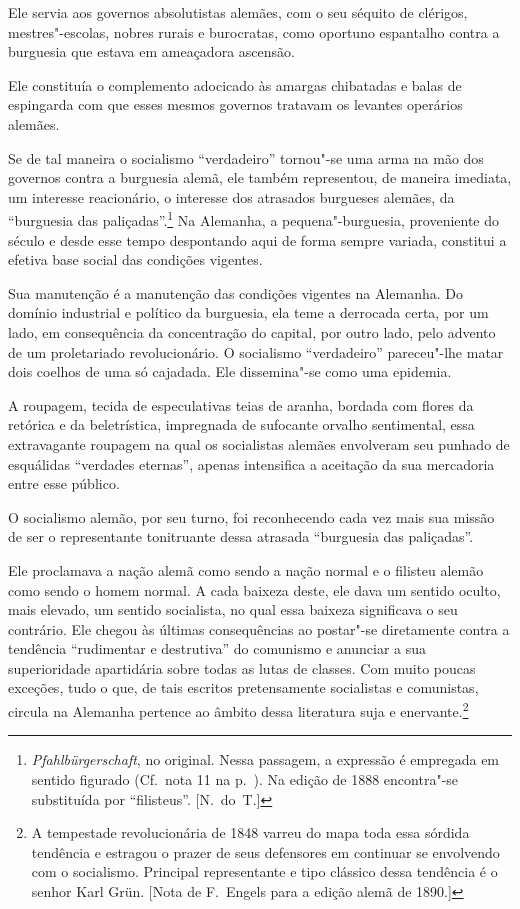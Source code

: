 Ele servia aos governos absolutistas alemães, com o seu séquito de
clérigos, mestres"-escolas, nobres rurais e burocratas, como oportuno
espantalho contra a burguesia que estava em ameaçadora ascensão.

Ele constituía o complemento adocicado às amargas chibatadas e balas de
espingarda com que esses mesmos governos tratavam os levantes operários
alemães.

Se de tal maneira o socialismo “verdadeiro” tornou"-se uma arma
na mão dos governos contra a burguesia alemã, ele também representou,
de maneira imediata, um interesse reacionário, o interesse dos
atrasados burgueses alemães, da “burguesia das paliçadas”.\footnote{ \textit
{Pfahlbürgerschaft}, no original. Nessa passagem, a expressão é empregada
em sentido figurado (Cf.~nota 11 na p.~\pageref{8}). Na edição de 1888 encontra"-se substituída 
por “filisteus”. [N.~do~T.]} Na Alemanha, a pequena"-burguesia, 
proveniente do século  e desde esse tempo despontando aqui de forma sempre 
variada, constitui a efetiva base social das condições vigentes.

Sua manutenção é a manutenção das condições vigentes na Alemanha. Do
domínio industrial e político da burguesia, ela teme a derrocada certa,
por um lado, em consequência da concentração do capital, por outro lado,
pelo advento de um proletariado revolucionário. O socialismo
“verdadeiro” pareceu"-lhe matar dois coelhos de uma só cajadada. Ele
dissemina"-se como uma epidemia.

A roupagem, tecida de especulativas teias de aranha, bordada com flores
da retórica e da beletrística, impregnada de sufocante orvalho
sentimental, essa extravagante roupagem na qual os socialistas alemães
envolveram seu punhado de esquálidas “verdades eternas”, apenas
intensifica a aceitação da sua mercadoria entre esse público.

O socialismo alemão, por seu turno, foi reconhecendo cada vez mais sua
missão de ser o representante tonitruante dessa atrasada “burguesia das
paliçadas”.

Ele proclamava a nação alemã como sendo a nação normal e o
filisteu alemão como sendo o homem normal. A cada baixeza deste, ele
dava um sentido oculto, mais elevado, um sentido socialista, no qual
essa baixeza significava o seu contrário. Ele chegou às últimas
consequências ao postar"-se diretamente contra a tendência “rudimentar
e destrutiva” do comunismo e anunciar a sua superioridade apartidária
sobre todas as lutas de classes. Com muito poucas exceções, tudo o que,
de tais escritos pretensamente socialistas e comunistas, circula na
Alemanha pertence ao âmbito dessa literatura suja e enervante.\footnote{ A 
tempestade revolucionária de 1848 varreu do mapa toda essa sórdida 
tendência e estragou o prazer de seus defensores em continuar se envolvendo
com o socialismo. Principal representante e tipo clássico dessa tendência é
o senhor Karl Grün. [Nota de F.~Engels para a edição alemã de 1890.]}

